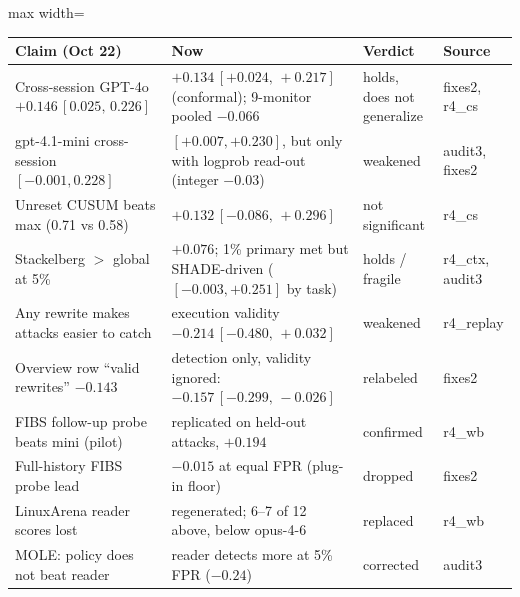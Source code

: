 \documentclass[11pt]{article}
\newcommand{\ci}[2]{\,[#1,\,#2]}
\begin{document}
\begin{table}[H]\centering\small
\begin{adjustbox}{max width=\linewidth}
\begin{tabular}{@{}llll@{}}
\toprule
Claim (Oct 22) & Now & Verdict & Source\\
\midrule
Cross-session GPT-4o $+0.146\ci{0.025}{0.226}$ & $+0.134\ci{+0.024}{+0.217}$ (conformal); 9-monitor pooled $-0.066$ & holds, does not generalize & fixes2, r4\_cs\\
gpt-4.1-mini cross-session $[-0.001, 0.228]$ & $[+0.007, +0.230]$, but only with logprob read-out (integer $-0.03$) & weakened & audit3, fixes2\\
Unreset CUSUM beats max (0.71 vs 0.58) & $+0.132\ci{-0.086}{+0.296}$ & not significant & r4\_cs\\
Stackelberg $>$ global at 5\% & $+0.076$; 1\% primary met but SHADE-driven ($[-0.003, +0.251]$ by task) & holds / fragile & r4\_ctx, audit3\\
Any rewrite makes attacks easier to catch & execution validity $-0.214\ci{-0.480}{+0.032}$ & weakened & r4\_replay\\
Overview row ``valid rewrites'' $-0.143$ & detection only, validity ignored: $-0.157\ci{-0.299}{-0.026}$ & relabeled & fixes2\\
FIBS follow-up probe beats mini (pilot) & replicated on held-out attacks, $+0.194$ & confirmed & r4\_wb\\
Full-history FIBS probe lead & $-0.015$ at equal FPR (plug-in floor) & dropped & fixes2\\
LinuxArena reader scores lost & regenerated; 6--7 of 12 above, below opus-4-6 & replaced & r4\_wb\\
MOLE: policy does not beat reader & reader detects more at 5\% FPR ($-0.24$) & corrected & audit3\\
\bottomrule
\end{tabular}
\end{adjustbox}
\end{table}
\end{document}
